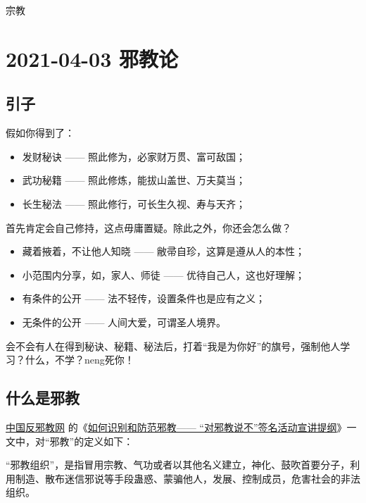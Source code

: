 \begin{taged}{宗教}
\section{2021-04-03 邪教论}
\end{taged}

\subsection{引子}

假如你得到了：

\begin{itemize}[nosep, left=\parindent]
    \item 发财秘诀 —— 照此修为，必家财万贯、富可敌国；
    \item 武功秘籍 —— 照此修炼，能拔山盖世、万夫莫当；
    \item 长生秘法 —— 照此修行，可长生久视、寿与天齐；
\end{itemize}

首先肯定会自己修持，这点毋庸置疑。除此之外，你还会怎么做？

\begin{itemize}[nosep, left=\parindent]
    \item 藏着掖着，不让他人知晓 —— 敝帚自珍，这算是遵从人的本性；
    \item 小范围内分享，如，家人、师徒 —— 优待自己人，这也好理解；
    \item 有条件的公开 —— 法不轻传，设置条件也是应有之义；
    \item 无条件的公开 —— 人间大爱，可谓圣人境界。
\end{itemize}

会不会有人在得到秘诀、秘籍、秘法后，打着“我是为你好”的旗号，强制他人学习？什么，不学？neng死你！

\subsection{什么是邪教}

\href{http://www.chinafxj.cn/}{中国反邪教网} 的《\href{http://www.chinafxj.cn/c/2020-11-03/1286958.shtml}{如何识别和防范邪教—— “对邪教说不”签名活动宣讲提纲}》一文中，对“邪教”的定义如下：

\begin{screen}
    “邪教组织”，是指冒用宗教、气功或者以其他名义建立，神化、鼓吹首要分子，利用制造、散布迷信邪说等手段蛊惑、蒙骗他人，发展、控制成员，危害社会的非法组织。
\end{screen}


